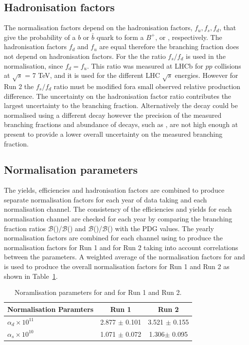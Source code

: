 {{{\subsection{Hadronisation factors}

The normalisation factors depend on the hadronisation factors, $f_{u}, f_{s}, f_{d}$, that give the probability of a $b$ or $\bar{b}$ quark to form a $B^{+}$, \bs or \bd, respectively. The hadronisation factors $f_{d}$ and $f_{u}$ are equal therefore the \bdmumu branching fraction does not depend on hadronisation factors. For the \bsmumu the ratio $f_{s}/f_{d}$ is used in the normalisation, since $f_{d} = f_{u}$. This ratio was measured at LHCb for $pp$ collisions at $\sqrt{s}$ = 7 TeV, and it is used for the different LHC $\sqrt{s}$ energies. However for Run 2 the $f_{s}/f_{d}$ ratio must be modified fora small observed relative production difference. 
The uncertainty on the hadronisation factor ratio contributes the largest uncertainty to the \bsmumu branching fraction. Alternatively the \bsmumu decay could be normalised using a different \bs decay however the precision of the measured branching fractions and abundance of \bs decays, such as \bsjpsiphi, are not high enough at present to provide a lower overall uncertainty on the measured branching fraction.

\subsection{Normalisation parameters}

The yields, efficiencies and hadronisation factors are combined to produce separate normalisation factors for each year of data taking and each normalisation channel. The consistency of the efficiencies and yields for each normalisation channel are checked for each year by comparing the branching fraction ratios $\mathcal{B}$(\bdkpi)/$\mathcal{B}$(\bujpsik) and $\mathcal{B}$(\bujpsik)/$\mathcal{B}$(\bsjpsiphi) with the PDG values. The yearly normalisation factors are combined for each channel using to produce the normalisation factors for Run 1 and for Run 2 taking into account correlations between the parameters. A weighted average of the normalisation factors for \bdkpi and \bujpsiK is used to produce the overall normalisation factors for Run 1 and Run 2 as shown in Table~\ref{tab:normparams}.

\begin{table}[htbp]
\begin{center}
\begin{tabular}{lcc}
\hline
Normalisation Paramters & Run 1 & Run 2 \\ \hline
$\alpha_{d} \times 10^{11}$ & 2.877 $\pm$ 0.101 & 3.521 $\pm$ 0.155 \\ %
$\alpha_{s} \times 10^{10}$ & 1.071 $\pm$ 0.072 & 1.306$ \pm$ 0.095 \\
\hline
\end{tabular}
\vspace{0.7cm}
\caption{Noramlisation parameters for \bsmumu and \bdmumu for Run 1 and Run 2.}
\label{tab:normparams}
\end{center}
\vspace{-1.0cm}
\end{table}


}}}
